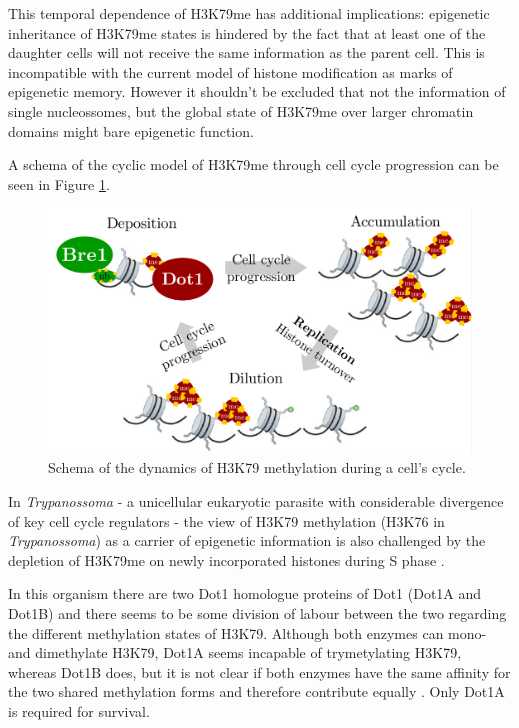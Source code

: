 \documentclass[11pt,twoside,a4paper]{report}
\begin{document}
		This temporal dependence of H3K79me has additional implications: epigenetic inheritance of H3K79me states is hindered by the fact that at least one of the daughter cells will not receive the same information as the parent cell. This is incompatible with the current model of histone modification as marks of epigenetic memory. However it shouldn't be excluded that not the information of single nucleossomes, but the global state of H3K79me over larger chromatin domains might bare epigenetic function.
		
		A schema of the cyclic model of H3K79me through cell cycle progression can be seen in Figure \ref{fig:dot1_k79}.
		
		\begin{figure}[here]
			\centering
			\includegraphics[width=0.9\linewidth]{pngs/dot1_k79.png}
			\caption{Schema of the dynamics of H3K79 methylation during a cell's cycle.}
			\label{fig:dot1_k79}
		\end{figure}
		
		In \textit{Trypanossoma} - a unicellular eukaryotic parasite with considerable divergence of key cell cycle regulators - the view of H3K79 methylation (H3K76 in \textit{Trypanossoma}) as a carrier of epigenetic information is also challenged by the depletion of H3K79me on newly incorporated histones during S phase \cite{Gassen2012}.
		
		In this organism there are two Dot1 homologue proteins of Dot1 (Dot1A and Dot1B) and there seems to be some division of labour between the two regarding the different methylation states of H3K79. Although both enzymes can mono- and dimethylate H3K79, Dot1A seems incapable of trymetylating H3K79, whereas Dot1B does, but it is not clear if both enzymes have the same affinity for the two shared methylation forms and therefore contribute equally \cite{Gassen2012}. Only Dot1A is required for survival.
	
\end{document}
